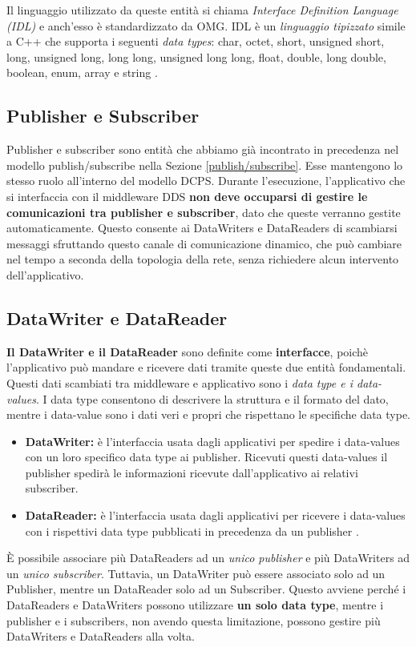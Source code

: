 Il linguaggio utilizzato da queste entità si chiama \textit{Interface 
Definition Language (IDL)} e anch'esso è standardizzato da OMG. 
IDL è un \textit{linguaggio tipizzato} 
simile a C++ che supporta i seguenti \textit{data types}: char, octet, short,
unsigned short, long, unsigned long, long long, unsigned long long, 
float, double, long double, boolean, enum, array e string
\cite{1494965}.


\subsection{Publisher e Subscriber}
Publisher e subscriber sono entità che abbiamo già incontrato
in precedenza nel modello publish/subscribe nella Sezione
\ref{publish/subscribe}. Esse 
mantengono lo stesso ruolo all'interno del modello DCPS. 
Durante l'esecuzione, l'applicativo che si interfaccia con il 
middleware DDS \textbf{non deve occuparsi 
di gestire le comunicazioni tra publisher e subscriber}, dato 
che queste verranno gestite automaticamente. 
Questo consente ai DataWriters e DataReaders di 
scambiarsi messaggi sfruttando questo canale di comunicazione
dinamico,
che può cambiare nel tempo a seconda della topologia della rete, 
senza richiedere alcun intervento dell'applicativo. 

\subsection{DataWriter e DataReader}

\textbf{Il DataWriter e il DataReader} sono definite come \textbf{interfacce}, 
poichè l'applicativo
può mandare e ricevere dati
tramite queste due entità fondamentali. 
Questi dati scambiati tra middleware e applicativo
sono i \textit{data type e i data-values}. I data type consentono di 
descrivere la struttura e il formato del dato, mentre i data-value
sono i dati veri e propri che rispettano le specifiche data type.
\begin{itemize}
    \item \textbf{DataWriter:} è l'interfaccia usata dagli applicativi 
    per spedire i
    data-values con un loro specifico data type ai publisher.
    Ricevuti questi data-values il publisher spedirà le
    informazioni ricevute dall'applicativo ai relativi subscriber.
    \item \textbf{DataReader:} è l'interfaccia usata dagli applicativi per
    ricevere i data-values con i rispettivi data type pubblicati in
    precedenza da un publisher \cite{dds1.4}.
\end{itemize}
È possibile
associare più DataReaders ad un \textit{unico publisher} e più DataWriters ad
un \textit{unico subscriber}. Tuttavia, un DataWriter può essere associato solo ad un 
Publisher, mentre un DataReader solo ad un Subscriber. 
Questo avviene perché
i DataReaders e DataWriters possono utilizzare \textbf{un solo data type}, 
mentre 
i publisher e i subscribers, non avendo questa limitazione, possono gestire 
più DataWriters e DataReaders alla volta.

